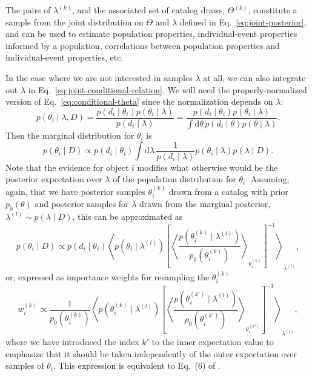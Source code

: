 \documentclass[modern]{aastex63}
\newcommand{\dd}{\ensuremath{\mathrm{d}}}
\begin{document}
The pairs of $\lambda^{(k)}$, and the associated set of catalog draws,
$\Theta^{(k)}$, constitute a sample from the joint distribution on $\Theta$ and
$\lambda$ defined in Eq.\ \eqref{eq:joint-posterior}, and can be used to
estimate population properties, individual-event properties informed by a
population, correlations between population properties and individual-event
properties, etc.

In the case where we are not interested in samples $\lambda$ at all, we can also
integrate out $\lambda$ in Eq.\ \eqref{eq:joint-conditional-relation}.  We will
need the properly-normalized version of Eq.\ \eqref{eq:conditional-theta} since
the normalization depends on $\lambda$:
%
\begin{equation}
  p\left( \theta_i \mid \lambda, D \right) = \frac{p\left( d_i \mid \theta_i \right) p\left( \theta_i \mid \lambda\right)}{p\left( d_i \mid \lambda \right)} = \frac{p\left( d_i \mid \theta_i \right) p\left( \theta_i \mid \lambda\right)}{\int \dd \theta \, p\left( d_i \mid \theta\right) p\left( \theta \mid \lambda \right)}.
\end{equation}
%
Then the marginal distribution for $\theta_i$ is
%
\begin{equation}
  \label{eq:theta-marginal}
  p\left( \theta_i \mid D \right) \propto p\left( d_i \mid \theta_i \right) \int \dd \lambda \, \frac{1}{p\left( d_i \mid \lambda \right)} p\left( \theta_i \mid \lambda \right) p\left( \lambda \mid D \right).
\end{equation}
%
Note that the evidence for object $i$ modifies what otherwise would be the
posterior expectation over $\lambda$ of the population distribution for
$\theta_i$.   Assuming, again, that we have posterior samples $\theta_i^{(k)}$
drawn from a catalog with prior $p_0\left(\theta \right)$ and posterior samples
for $\lambda$ drawn from the marginal posterior, $\lambda^{(l)} \sim p\left(
\lambda \mid D \right)$, this can be approximated as
%
\begin{equation}
  \label{eq:theta-marginal-samples}
  p\left( \theta_i \mid D \right) \propto p\left( d_i \mid \theta_i \right) \left\langle p\left( \theta_i \mid \lambda^{(l)} \right) \left[\left\langle \frac{p\left( \theta_i^{(k)} \mid \lambda^{(l)} \right)}{p_0 \left( \theta_i^{(k)} \right)} \right\rangle_{\theta_i^{(k)}} \right]^{-1} \right\rangle_{\lambda^{(l)}},
\end{equation}
%
or, expressed as importance weights for resampling the $\theta^{(k)}_i$
%
\begin{equation}
  \label{eq:theta-marginal-weights}
  w_i^{(k)} \propto \frac{1}{p_0\left( \theta_i^{(k)} \right)} \left\langle p\left( \theta_i^{(k)} \mid \lambda^{(l)} \right) \left[\left\langle \frac{p\left( \theta_i^{(k')} \mid \lambda^{(l)} \right)}{p_0 \left( \theta_i^{(k')} \right)} \right\rangle_{\theta_i^{(k')}} \right]^{-1} \right\rangle_{\lambda^{(l)}},
\end{equation}
%
where we have introduced the index $k'$ to the inner expectation value to
emphasize that it should be taken independently of the outer expectation over
samples of $\theta_i$. This expression is equivalent to Eq.\ (6) of
\citet{Callister2019}.
\end{document}
